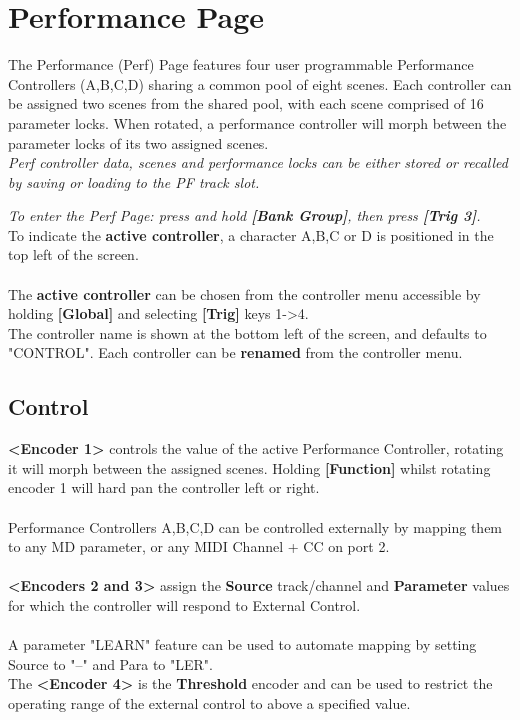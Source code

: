 \chapter{Performance Page}
The Performance (Perf) Page features four user programmable Performance Controllers (A,B,C,D) sharing a common pool of eight scenes. Each controller can be assigned two scenes from the shared pool, with each scene comprised of 16 parameter locks.  When rotated, a performance controller will morph between the parameter locks of its two assigned scenes.\\

\textit{Perf controller data, scenes and performance locks can be either stored or recalled by saving or loading to the PF track slot.}

\textit{To enter the Perf Page: press and hold \textbf{[Bank Group]}, then press \textbf{[Trig 3]}.}
\\
To indicate the \textbf{active controller}, a character  A,B,C or D is positioned in the top left of the screen.\\\\
The \textbf{active controller} can be chosen from the controller menu accessible by holding \textbf{[Global]} and selecting \textbf{[Trig]} keys 1->4.\\
\newpage
The controller name is shown at the bottom left of the screen, and defaults to "CONTROL". Each controller can be \textbf{renamed} from the controller menu.
\section{Control}
\textbf{<Encoder 1>} controls the value of the active Performance Controller, rotating it will morph between the assigned scenes. Holding \textbf{[Function]} whilst rotating encoder 1 will hard pan the controller left or right.\\
\\
Performance Controllers A,B,C,D can be controlled externally by mapping them to any MD parameter, or any MIDI Channel + CC on port 2. \\\\
\textbf{<Encoders 2 and 3>} assign the \textbf{Source} track/channel and \textbf{Parameter} values for which the controller will respond to External Control.\\\\
A parameter "LEARN" feature can be used to automate mapping by setting Source to "--" and Para to "LER".
\\
The \textbf{<Encoder 4>} is the \textbf{Threshold} encoder and can be used to restrict the operating range of the external control to above a specified value.
\newpage
